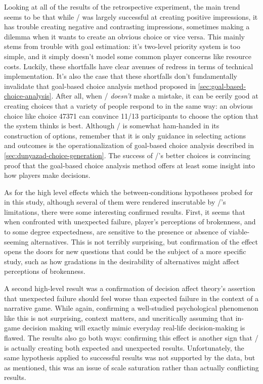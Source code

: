 Looking at all of the results of the retrospective experiment, the main trend seems to be that while \dunyazad/ was largely successful at creating positive impressions, it has trouble creating negative and contrasting impressions, sometimes making a dilemma when it wants to create an obvious choice or vice versa.
%
This mainly stems from trouble with goal estimation: it's two-level priority system is too simple, and it simply doesn't model some common player concerns like resource costs.
%
Luckily, these shortfalls have clear avenues of redress in terms of technical implementation.
%
It's also the case that these shortfalls don't fundamentally invalidate that goal-based choice analysis method proposed in \cref{sec:goal-based-choice-analysis}.
%
After all, when \dunyazad/ \emph{doesn't} make a mistake, it can be eerily good at creating choices that a variety of people respond to in the same way: an obvious choice like choice 47371 can convince 11/13 participants to choose the option that the system thinks is best.
%
Although \dunyazad/ is somewhat ham-handed in its construction of options, remember that it is only guidance in selecting actions and outcomes is the operationalization of goal-based choice analysis described in \cref{sec:dunyazad-choice-generation}.
%
The success of \dunyazad/'s better choices is convincing proof that the goal-based choice analysis method offers at least some insight into how players make decisions.


As for the high level effects which the between-conditions hypotheses probed for in this study, although several of them were rendered inscrutable by \dunyazad/'s limitations, there were some interesting confirmed results.
%
First, it seems that when confronted with unexpected failure, player's perceptions of brokenness, and to some degree expectedness, are sensitive to the presence or absence of viable-seeming alternatives.
%
This is not terribly surprising, but confirmation of the effect opens the doors for new questions that could be the subject of a more specific study, such as how gradations in the desirability of alternatives might affect perceptions of brokenness.


A second high-level result was a confirmation of decision affect theory's assertion that unexpected failure should feel worse than expected failure \citep{Mellers1999} in the context of a narrative game.
%
While again, confirming a well-studied psychological phenomenon like this is not surprising, context matters, and uncritically assuming that in-game decision making will exactly mimic everyday real-life decision-making is flawed.
%
The results also go both ways: confirming this effect is another sign that \dunyazad/ is actually creating both expected and unexpected results.
%
Unfortunately, the same hypothesis applied to successful results was not supported by the data, but as mentioned, this was an issue of scale saturation rather than actually conflicting results.


